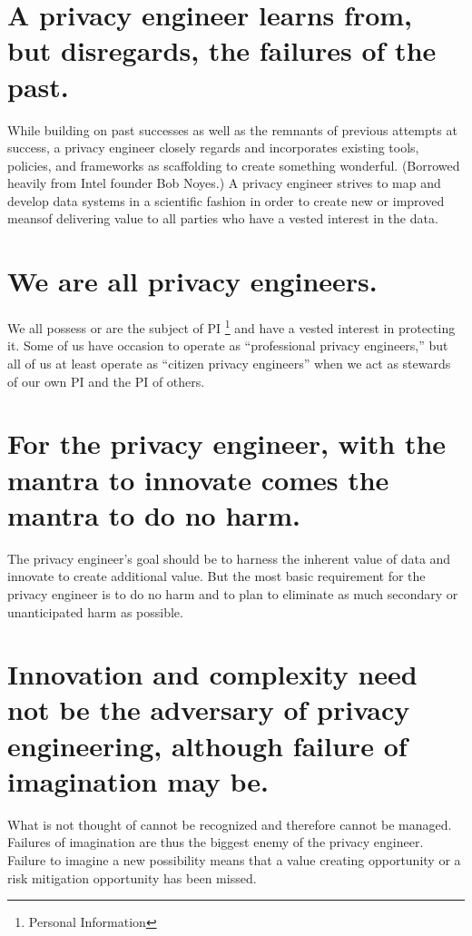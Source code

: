 \documentclass[letterpaper,12pt,english]{sphinxmanual}
\begin{document}
\section{A privacy engineer learns from, but disregards, the failures of the past.}
\label{privacy:a-privacy-engineer-learns-from-but-disregards-the-failures-of-the-past}
While building on past successes as well as the remnants of previous attempts at success, a privacy engineer closely regards and incorporates existing tools, policies, and frameworks as scaffolding to create something wonderful. (Borrowed heavily from Intel founder Bob Noyes.) A privacy engineer strives to map and develop data systems in a scientific fashion in order to create new or improved meansof delivering value to all parties who have a vested interest in the data.


\section{We are all privacy engineers.}
\label{privacy:we-are-all-privacy-engineers}
We all possess or are the subject of PI \footnote{
Personal Information
} and have a vested interest in protecting it. Some of us have occasion to operate as “professional privacy engineers,” but all of us at least operate as “citizen privacy engineers” when we act as stewards of our own PI and the PI of others.


\section{For the privacy engineer, with the mantra to innovate comes the mantra to do no harm.}
\label{privacy:for-the-privacy-engineer-with-the-mantra-to-innovate-comes-the-mantra-to-do-no-harm}
The privacy engineer’s goal should be to harness the inherent value of data and innovate to create additional value. But the most basic requirement for the privacy engineer is to do no harm and to plan to eliminate as much secondary or unanticipated harm as possible.


\section{Innovation and complexity need not be the adversary of privacy engineering, although failure of imagination may be.}
\label{privacy:innovation-and-complexity-need-not-be-the-adversary-of-privacy-engineering-although-failure-of-imagination-may-be}
What is not thought of cannot be recognized and therefore cannot be managed. Failures of imagination are thus the biggest enemy of the privacy engineer. Failure to imagine a new possibility means that a value creating opportunity or a risk mitigation opportunity has been missed.
\end{document}
